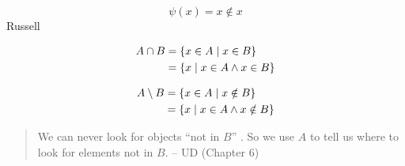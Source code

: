 \begin{frame}{}
  \[
    \psi(x) = x \notin x
  \]
  Russell
\end{frame}

\begin{frame}{}
  \begin{theorem}[]
  \end{theorem}

  \begin{definition}[]
  \end{definition}
\end{frame}

\begin{frame}{}


\end{frame}

\begin{frame}{}
\end{frame}

\begin{frame}{}
  \begin{definition}[``$\cap$'']
    \vspace{-0.50cm}
    \begin{align*}
      A \cap B &= \{x \in A \mid x \in B\} \\
	       &= \{x \mid x \in A \land x \in B\}
    \end{align*}
  \end{definition}

  \vspace{0.80cm}
  \begin{definition}[``$\setminus$'']
    \vspace{-0.50cm}
    \begin{align*}
      A \setminus B &= \{x \in A \mid x \notin B\} \\
	       &= \{x \mid x \in A \land x \notin B\}
    \end{align*}
  \end{definition}

  \pause
  \vspace{0.30cm}
  \begin{quote}
    We can never look for objects ``not in $B$'' .
    So we use $A$ to tell us where to look for elements not in $B$.
    \hfill -- UD (Chapter 6)
  \end{quote}
\end{frame}
